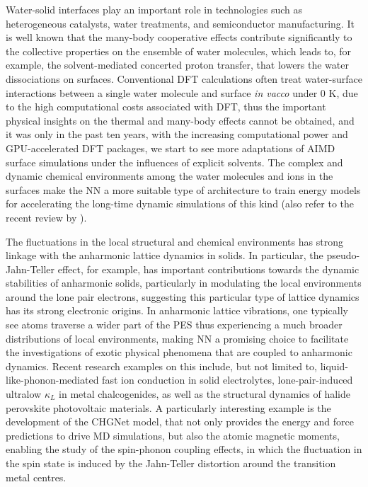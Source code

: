 Water-solid interfaces play an important role in technologies such as heterogeneous catalysts, water treatments, and semiconductor manufacturing. It is well known that the many-body cooperative effects\cite{mahadevi2016cooperativity} contribute significantly to the collective properties on the ensemble of water molecules, which leads to, for example, the   solvent-mediated concerted proton transfer, that lowers the water dissociations on  surfaces.\cite{andrade2020free} Conventional DFT calculations often treat water-surface interactions between a single water molecule and surface \emph{in vacco} under 0 K, due to the high computational costs associated with DFT, thus the important physical insights on the thermal and many-body effects cannot be obtained, and it was only in the past ten years, with the increasing computational power and GPU-accelerated DFT packages, we start to see more adaptations of AIMD surface simulations under the influences of explicit solvents.\cite{sakong2018electric} The complex and dynamic chemical environments among the water molecules and ions in the surfaces make the NN a more suitable type of architecture to train energy models for accelerating the long-time dynamic simulations of this kind\cite{andrade2020free,zeng2023mechanistic,chen2023accelerating,zhang2024modelling,elsner2025atomistic} (also refer to the recent review by \citet{wang2026machine}).

The fluctuations in the local structural and chemical environments has strong linkage with the anharmonic lattice dynamics in solids. In particular, the pseudo-Jahn-Teller effect,\cite{bersuker2013pseudo} for example, has important contributions towards the dynamic stabilities of anharmonic solids, particularly in modulating the local environments around the lone pair electrons,\cite{laurita2022chemistry} suggesting this particular type of lattice dynamics has its strong electronic origins. In anharmonic lattice vibrations, one typically see atoms traverse a wider part of the PES thus experiencing a much broader distributions of local environments, making NN a promising choice to facilitate the investigations of exotic physical phenomena that are coupled to anharmonic dynamics. Recent research examples on this include, but not limited to, liquid-like-phonon-mediated fast ion conduction in solid electrolytes,\cite{ding2025liquid} lone-pair-induced ultralow $\kappa_L$ in metal chalcogenides,\cite{minhas2026unravelling} as well as the structural dynamics of halide perovskite photovoltaic materials.\cite{mao2025correlated} A particularly interesting example is the development of the CHGNet model,\cite{deng2023chgnet} that not only provides the energy and force predictions to drive MD simulations, but also the atomic magnetic moments, enabling the study of the spin-phonon coupling effects, in which the fluctuation in the spin state is induced by the Jahn-Teller distortion around the transition metal centres. 

